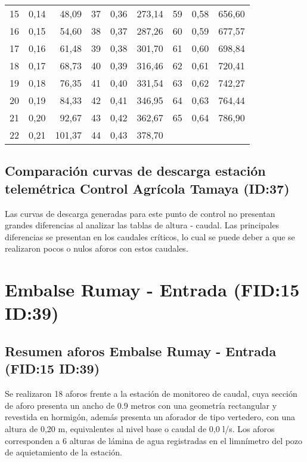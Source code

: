 \documentclass[]{article}
\begin{document}
\begin{table}[H]
\begin{center}
\begin{tabular}{rcrrcrrcr}
   15 & 0,14 & 48,09 &  37 & 0,36 & 273,14 &  59 & 0,58 & 656,60 \\ 
   16 & 0,15 & 54,60 &  38 & 0,37 & 287,26 &  60 & 0,59 & 677,57 \\ 
   17 & 0,16 & 61,48 &  39 & 0,38 & 301,70 &  61 & 0,60 & 698,84 \\ 
   18 & 0,17 & 68,73 &  40 & 0,39 & 316,46 &  62 & 0,61 & 720,41 \\ 
   19 & 0,18 & 76,35 &  41 & 0,40 & 331,54 &  63 & 0,62 & 742,27 \\ 
   20 & 0,19 & 84,33 &  42 & 0,41 & 346,95 &  64 & 0,63 & 764,44 \\ 
   21 & 0,20 & 92,67 &  43 & 0,42 & 362,67 &  65 & 0,64 & 786,90 \\ 
   22 & 0,21 & 101,37 &  44 & 0,43 & 378,70 &  &  &  \\ 
   \hline
\end{tabular}
\endgroup\end{center}
\end{table}

\subsection{Comparación curvas de descarga estación telemétrica Control Agrícola Tamaya (ID:37)}\label{comparación curvas}

Las curvas de descarga generadas para este punto de control no presentan grandes diferencias al analizar las tablas de altura - caudal. Las principales diferencias se presentan en los caudales críticos, lo cual se puede deber a que se realizaron pocos o nulos aforos con estos caudales.

\clearpage

\section{Embalse Rumay - Entrada (FID:15 ID:39)}\label{ID:39}

\subsection{Resumen aforos Embalse Rumay - Entrada (FID:15 ID:39)}\label{aforos ID:39}

Se realizaron 18 aforos frente a la estación de monitoreo de caudal, cuya sección de aforo presenta un ancho de 0.9 metros con una geometría rectangular y revestida en hormigón, además presenta un aforador de tipo vertedero, con una altura de 0,20 m, equivalentes al nivel base o caudal de 0,0 l/s. Los aforos corresponden a 6 alturas de lámina de agua registradas en el limnímetro del pozo de aquietamiento de la estación.
\end{document}
